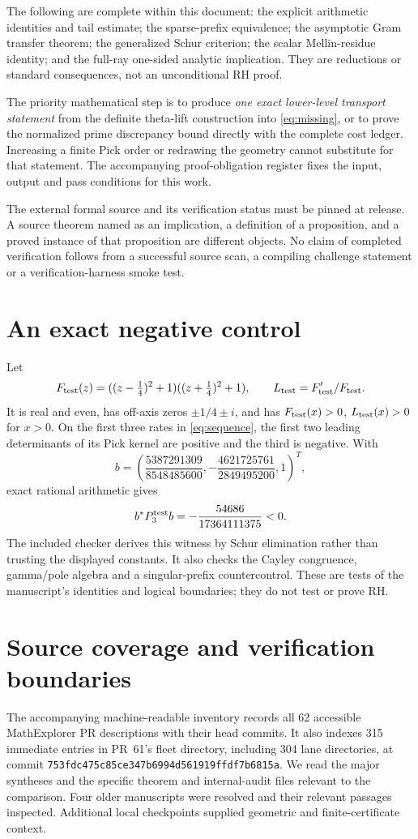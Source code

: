 \documentclass[11pt,letterpaper]{article}
\theoremstyle{definition}
\theoremstyle{remark}
\numberwithin{equation}{section}
\begin{document}
The following are complete within this document: the explicit arithmetic identities and tail estimate; the sparse-prefix equivalence; the asymptotic Gram transfer theorem; the generalized Schur criterion; the scalar Mellin-residue identity; and the full-ray one-sided analytic implication. They are reductions or standard consequences, not an unconditional RH proof.

The priority mathematical step is to produce \emph{one exact lower-level transport statement} from the definite theta-lift construction into \eqref{eq:missing}, or to prove the normalized prime discrepancy bound directly with the complete cost ledger. Increasing a finite Pick order or redrawing the geometry cannot substitute for that statement. The accompanying proof-obligation register fixes the input, output and pass conditions for this work.

The external formal source and its verification status must be pinned at release. A source theorem named as an implication, a definition of a proposition, and a proved instance of that proposition are different objects. No claim of completed verification follows from a successful source scan, a compiling challenge statement or a verification-harness smoke test.

\appendix
\section{An exact negative control}\label{app:control}
Let
\[
 F_{\rm test}(z)=((z-\tfrac14)^2+1)((z+\tfrac14)^2+1),
 \qquad L_{\rm test}=F'_{\rm test}/F_{\rm test}.
\]
It is real and even, has off-axis zeros $\pm1/4\pm i$, and has $F_{\rm test}(x)>0$, $L_{\rm test}(x)>0$ for $x>0$. On the first three rates in \eqref{eq:sequence}, the first two leading determinants of its Pick kernel are positive and the third is negative. With
\[
 b=\left(\frac{5387291309}{8548485600},
         -\frac{4621725761}{2849495200},1\right)^T,
\]
exact rational arithmetic gives
\[
 b^*P^{\rm test}_3b=-\frac{54686}{17364111375}<0.
\]
The included checker derives this witness by Schur elimination rather than trusting the displayed constants. It also checks the Cayley congruence, gamma/pole algebra and a singular-prefix countercontrol. These are tests of the manuscript's identities and logical boundaries; they do not test or prove RH.

\section{Source coverage and verification boundaries}
The accompanying machine-readable inventory records all 62 accessible MathExplorer PR descriptions with their head commits. It also indexes 315 immediate entries in PR~61's fleet directory, including 304 lane directories, at commit \texttt{753fdc475c85ce347b6994d561919ffdf7b6815a}. We read the major syntheses and the specific theorem and internal-audit files relevant to the comparison. Four older manuscripts were resolved and their relevant passages inspected. Additional local checkpoints supplied geometric and finite-certificate context.
\end{document}
